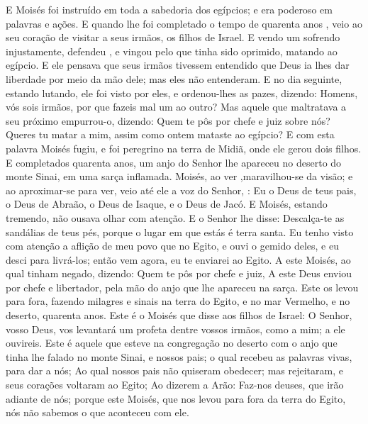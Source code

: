 {E Moisés foi instruído em toda a sabedoria dos egípcios; e era poderoso em palavras e ações.
E quando lhe foi completado o tempo de quarenta anos
{} , veio ao seu coração
{} de visitar a seus irmãos, os filhos de Israel.
E vendo um
{} sofrendo injustamente, defendeu
{} , e vingou pelo que tinha sido oprimido, matando ao egípcio.
E ele pensava que seus irmãos tivessem entendido que Deus ia lhes dar liberdade por meio da mão dele; mas eles não entenderam.
E no dia seguinte, estando
{} lutando, ele foi visto por eles, e ordenou-lhes
{} as pazes, dizendo: Homens, vós sois irmãos, por que fazeis mal um ao outro?
Mas aquele que maltratava a seu próximo empurrou-o, dizendo: Quem te pôs por chefe e juiz sobre nós?
Queres tu
{} matar a mim, assim como ontem mataste ao egípcio?
E com esta palavra Moisés fugiu, e foi peregrino na terra de Midiã, onde ele gerou dois filhos.
E completados quarenta anos, um anjo do Senhor lhe apareceu no deserto do monte Sinai, em uma sarça inflamada.
Moisés, ao ver
{} ,maravilhou-se da visão; e ao aproximar-se para ver, veio até ele a voz do Senhor,
 : Eu
{} o Deus de teus pais, o Deus de Abraão, o Deus de Isaque, e o Deus de Jacó. E Moisés, estando tremendo, não ousava olhar com atenção.
E o Senhor lhe disse: Descalça-te as sandálias de teus pés, porque o lugar em que estás é terra santa.
Eu tenho visto com atenção a aflição de meu povo que
{} no Egito, e ouvi o gemido deles, e eu desci para livrá-los; então vem agora, eu te enviarei ao Egito.
A este Moisés, ao qual tinham negado, dizendo: Quem te pôs por chefe e juiz, A este Deus enviou por chefe e libertador, pela mão do anjo que lhe apareceu na sarça.
Este os levou para fora, fazendo milagres e sinais na terra do Egito, e no mar Vermelho, e no deserto,
{} quarenta anos.
Este é o Moisés que disse aos filhos de Israel: O Senhor, vosso Deus, vos levantará um profeta dentre vossos irmãos, como a mim; a ele ouvireis.
Este é aquele que esteve na congregação
{} no deserto com o anjo que tinha lhe falado no monte Sinai, e
{} nossos pais; o qual recebeu as palavras vivas, para dar a nós;
Ao qual nossos pais não quiseram obedecer; mas
{} rejeitaram, e seus corações voltaram ao Egito;
Ao dizerem a Arão: Faz-nos deuses, que irão adiante de nós; porque
{} este Moisés, que nos levou para fora da terra do Egito, nós não sabemos o que aconteceu com ele.
}
